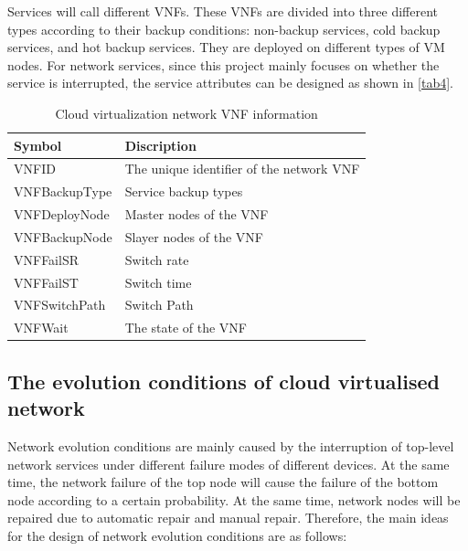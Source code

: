\documentclass[journal]{IEEEtran}
\begin{document}
    Services will call different VNFs. These VNFs are divided into three different types according to their backup conditions: non-backup services, cold backup services, and hot backup services. They are deployed on different types of VM nodes. For network services, since this project mainly focuses on whether the service is interrupted, the service attributes can be designed as shown in \ref{tab4}.
    \begin{table}[!t]
        \renewcommand{\arraystretch}{1.3}
        \caption{Cloud virtualization network VNF information}
        \label{tab3}
        \centering
        \begin{tabular}{|l||l|}
            \hline
            Symbol        & Discription                              \\
            \hline
            VNFID         & The unique identifier of the network VNF \\
            VNFBackupType & Service backup types                     \\
            VNFDeployNode & Master nodes of the VNF                  \\
            VNFBackupNode & Slayer nodes of the VNF                  \\
            VNFFailSR     & Switch rate                              \\
            VNFFailST     & Switch time                              \\
            VNFSwitchPath & Switch Path                              \\
            VNFWait       & The state of the VNF                     \\
            \hline
        \end{tabular}
    \end{table}

    \subsection{The evolution conditions of cloud virtualised network}
    Network evolution conditions are mainly caused by the interruption of top-level network services under different failure modes of different devices. At the same time, the network failure of the top node will cause the failure of the bottom node according to a certain probability. At the same time, network nodes will be repaired due to automatic repair and manual repair. Therefore, the main ideas for the design of network evolution conditions are as follows:
\end{document}
